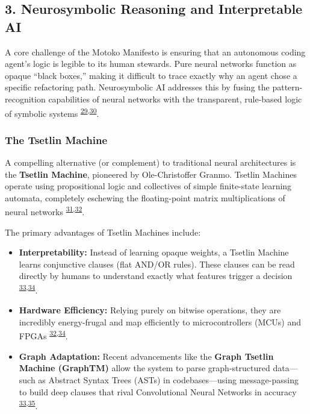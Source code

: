 \documentclass[
  11pt,
]{article}
\providecommand{\tightlist}{%
  \setlength{\itemsep}{0pt}\setlength{\parskip}{0pt}}
\begin{document}
\hypertarget{neurosymbolic-reasoning-and-interpretable-ai}{%
\subsection{3. Neurosymbolic Reasoning and Interpretable
AI}\label{neurosymbolic-reasoning-and-interpretable-ai}}

A core challenge of the Motoko Manifesto is ensuring that an autonomous
coding agent's logic is legible to its human stewards. Pure neural
networks function as opaque ``black boxes,'' making it difficult to
trace exactly why an agent chose a specific refactoring path.
Neurosymbolic AI addresses this by fusing the pattern-recognition
capabilities of neural networks with the transparent, rule-based logic
of symbolic systems
\textsuperscript{\protect\hyperlink{cite-29}{29},\protect\hyperlink{cite-30}{30}}.

\hypertarget{the-tsetlin-machine}{%
\subsubsection{The Tsetlin Machine}\label{the-tsetlin-machine}}

A compelling alternative (or complement) to traditional neural
architectures is the \textbf{Tsetlin Machine}, pioneered by
Ole-Christoffer Granmo. Tsetlin Machines operate using propositional
logic and collectives of simple finite-state learning automata,
completely eschewing the floating-point matrix multiplications of neural
networks
\textsuperscript{\protect\hyperlink{cite-31}{31},\protect\hyperlink{cite-32}{32}}.

The primary advantages of Tsetlin Machines include:

\begin{itemize}
\tightlist
\item
  \textbf{Interpretability:} Instead of learning opaque weights, a
  Tsetlin Machine learns conjunctive clauses (flat AND/OR rules). These
  clauses can be read directly by humans to understand exactly what
  features trigger a decision
  \textsuperscript{\protect\hyperlink{cite-33}{33},\protect\hyperlink{cite-34}{34}}.
\item
  \textbf{Hardware Efficiency:} Relying purely on bitwise operations,
  they are incredibly energy-frugal and map efficiently to
  microcontrollers (MCUs) and FPGAs
  \textsuperscript{\protect\hyperlink{cite-32}{32},\protect\hyperlink{cite-34}{34}}.
\item
  \textbf{Graph Adaptation:} Recent advancements like the \textbf{Graph
  Tsetlin Machine (GraphTM)} allow the system to parse graph-structured
  data---such as Abstract Syntax Trees (ASTs) in codebases---using
  message-passing to build deep clauses that rival Convolutional Neural
  Networks in accuracy
  \textsuperscript{\protect\hyperlink{cite-33}{33},\protect\hyperlink{cite-35}{35}}.
\end{itemize}
\end{document}
